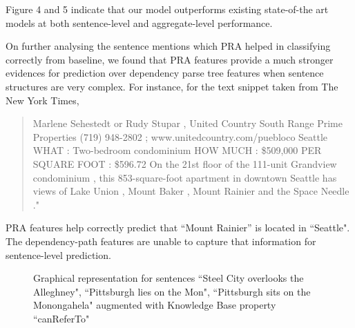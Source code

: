 \documentclass[11pt,a4paper]{article}
\begin{document}
Figure 4 and 5 indicate that our model outperforms existing state-of-the art
models at both sentence-level and aggregate-level performance.

On further analysing the sentence mentions which PRA helped in classifying
correctly from baseline, we found that PRA features provide a much stronger
evidences for prediction over dependency parse tree features when sentence
structures are very complex. For instance, for the text snippet taken from The
New York Times,

\begin{quote}
  Marlene Sehestedt or Rudy Stupar , United Country South Range Prime
  Properties (719) 948-2802 ; www.unitedcountry.com/puebloco Seattle WHAT :
  Two-bedroom condominium HOW MUCH : \$509,000 PER SQUARE FOOT : \$596.72 On
  the 21st floor of the 111-unit Grandview condominium , this 853-square-foot
  apartment in downtown Seattle has views of Lake Union , Mount Baker , Mount
  Rainier and the Space Needle ."
\end{quote}

PRA features help correctly predict that ``Mount Rainier'' is located in
``Seattle". The dependency-path features are unable to capture that information
for sentence-level prediction.

\begin{figure}
  \caption{Graphical representation for sentences ``Steel City overlooks the
    Alleghney", ``Pittsburgh lies on the Mon", ``Pittsburgh sits on the
    Monongahela" augmented with Knowledge Base property ``canReferTo"}
  \label{fig:M1}
\end{figure}
\end{document}
